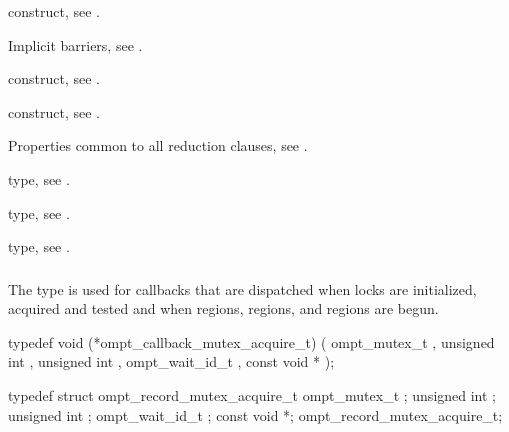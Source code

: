 \begin{crossrefs}
\item {} construct, see .

\item Implicit barriers, see .

\item {} construct, see .

\item {} construct, see .

\item Properties common to all reduction clauses,
see .

\item {} type, see .

\item {} type, see .

\item {} type, see .
\end{crossrefs}



\subsubsection{}
\label{sec:ompt_callback_mutex_acquire_t}

\summary
The  type is used for callbacks that are 
dispatched when locks are initialized, acquired and tested and when  
regions,  regions, and  regions are begun.

\format
\begin{ccppspecific}
\begin{omptCallback}
typedef void (*ompt_callback_mutex_acquire_t) (
  ompt_mutex_t ,
  unsigned int ,
  unsigned int ,
  ompt_wait_id_t ,
  const void *
);
\end{omptCallback}
\end{ccppspecific}

\record
\begin{ccppspecific}
\begin{omptRecord}
typedef struct ompt_record_mutex_acquire_t {
  ompt_mutex_t ;
  unsigned int ;
  unsigned int ;
  ompt_wait_id_t ;
  const void *;
} ompt_record_mutex_acquire_t;
\end{omptRecord}
\end{ccppspecific}

